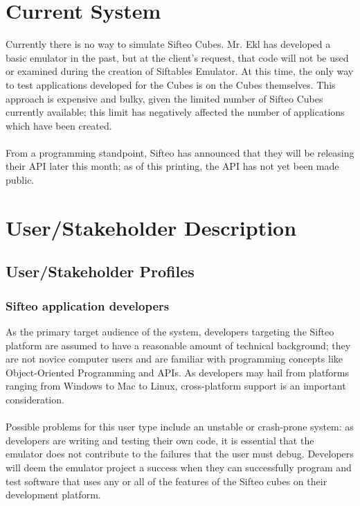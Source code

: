 \documentclass[12pt]{article}
\begin{document}
\section{Current System}
Currently there is no way to simulate Sifteo Cubes. Mr. Ekl has developed a basic emulator in the past, but at the client's request, that code will not be used or examined during the creation of Siftables Emulator. At this time, the only way to test applications developed for the Cubes is on the Cubes themselves. This approach is expensive and bulky, given the limited number of Sifteo Cubes currently available; this limit has negatively affected the number of applications which have been created.\\\\
From a programming standpoint, Sifteo has announced that they will be releasing their \gls{API} later this month; as of this printing, the \gls{API} has not yet been made public.

\section{User/Stakeholder Description}

               \subsection{User/Stakeholder Profiles}

                          \subsubsection{Sifteo application developers}
                          As the primary target audience of the system, developers targeting the Sifteo platform are assumed to have a reasonable amount of technical background; they are not novice computer users and are familiar with programming concepts like \gls{Object-Oriented Programming} and \gls{API}s. As developers may hail from platforms ranging from \gls{Windows} to \gls{Mac} to \gls{Linux}, \gls{cross-platform support} is an important consideration.\\\\
                          Possible problems for this user type include an unstable or crash-prone system: as developers are writing and testing their own code, it is essential that the emulator does not contribute to the failures that the user must debug. Developers will deem the emulator project a success when they can successfully program and test software that uses any or all of the features of the Sifteo cubes on their development platform.
\end{document}
